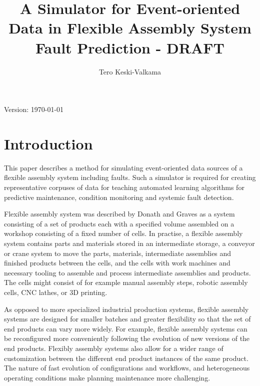 \documentclass[journal]{IEEEtran}
\title{A Simulator for Event-oriented Data in Flexible Assembly System Fault Prediction - DRAFT}
\author{Tero Keski-Valkama}
\begin{document}
\maketitle
Version: \today

\begin{abstract}

\end{abstract}

\begin{IEEEkeywords}
\end{IEEEkeywords}

\section{Introduction}
This paper describes a method for simulating event-oriented data sources of a flexible assembly system including faults. Such a simulator is required for creating representative corpuses
of data for teaching automated learning algorithms for predictive maintenance, condition monitoring and systemic fault detection.

Flexible assembly system was described by Donath and Graves \cite{donath1988flexible} as a system consisting of a set of products each with a specified volume
assembled on a workshop consisting of a fixed number of cells. In practise, a flexible assembly system contains parts and materials stored in an intermediate storage,
a conveyor or crane system to move the parts, materials, intermediate assemblies and finished products between the cells, and the cells with work machines and necessary tooling
to assemble and process intermediate assemblies and products. The cells might consist of for example manual assembly steps, robotic assembly cells, CNC lathes, or 3D printing.

As opposed to more specialized industrial production systems, flexible assembly systems are designed for smaller batches and greater flexibility so that the set of end products can vary more widely.
For example, flexible assembly systems can be reconfigured more conveniently following the evolution of new versions of the end products. Flexibly assembly systems also allow for a wider range
of customization between the different end product instances of the same product. The nature of fast evolution of configurations and workflows, and heterogeneous operating conditions make
planning maintenance more challenging.
\end{document}
